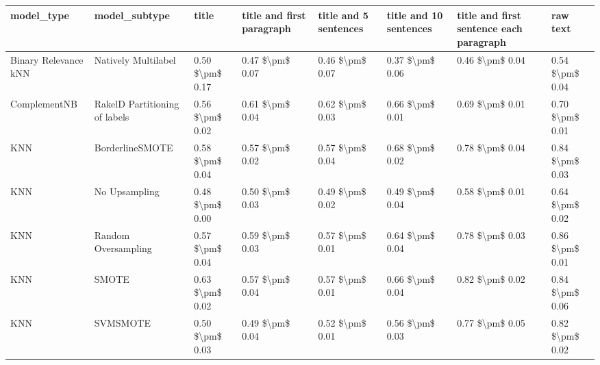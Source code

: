 \begin{tabular}{llllllll}
\toprule
                     model\_type &                 model\_subtype &               title & title and first paragraph & title and 5 sentences & title and 10 sentences & title and first sentence each paragraph &        raw text \\
\midrule
           Binary Relevance kNN &           Natively Multilabel &     0.50 \$\textbackslash pm\$ 0.17 &           0.47 \$\textbackslash pm\$ 0.07 &       0.46 \$\textbackslash pm\$ 0.07 &        0.37 \$\textbackslash pm\$ 0.06 &                         0.46 \$\textbackslash pm\$ 0.04 & 0.54 \$\textbackslash pm\$ 0.04 \\
                   ComplementNB & RakelD Partitioning of labels &     0.56 \$\textbackslash pm\$ 0.02 &           0.61 \$\textbackslash pm\$ 0.04 &       0.62 \$\textbackslash pm\$ 0.03 &        0.66 \$\textbackslash pm\$ 0.01 &                         0.69 \$\textbackslash pm\$ 0.01 & 0.70 \$\textbackslash pm\$ 0.01 \\
                            KNN &               BorderlineSMOTE &     0.58 \$\textbackslash pm\$ 0.04 &           0.57 \$\textbackslash pm\$ 0.02 &       0.57 \$\textbackslash pm\$ 0.04 &        0.68 \$\textbackslash pm\$ 0.02 &                         0.78 \$\textbackslash pm\$ 0.04 & 0.84 \$\textbackslash pm\$ 0.03 \\
                            KNN &                 No Upsampling &     0.48 \$\textbackslash pm\$ 0.00 &           0.50 \$\textbackslash pm\$ 0.03 &       0.49 \$\textbackslash pm\$ 0.02 &        0.49 \$\textbackslash pm\$ 0.04 &                         0.58 \$\textbackslash pm\$ 0.01 & 0.64 \$\textbackslash pm\$ 0.02 \\
                            KNN &           Random Oversampling &     0.57 \$\textbackslash pm\$ 0.04 &           0.59 \$\textbackslash pm\$ 0.03 &       0.57 \$\textbackslash pm\$ 0.01 &        0.64 \$\textbackslash pm\$ 0.04 &                         0.78 \$\textbackslash pm\$ 0.03 & 0.86 \$\textbackslash pm\$ 0.01 \\
                            KNN &                         SMOTE &     0.63 \$\textbackslash pm\$ 0.02 &           0.57 \$\textbackslash pm\$ 0.04 &       0.57 \$\textbackslash pm\$ 0.01 &        0.66 \$\textbackslash pm\$ 0.04 &                         0.82 \$\textbackslash pm\$ 0.02 & 0.84 \$\textbackslash pm\$ 0.06 \\
                            KNN &                      SVMSMOTE &     0.50 \$\textbackslash pm\$ 0.03 &           0.49 \$\textbackslash pm\$ 0.04 &       0.52 \$\textbackslash pm\$ 0.01 &        0.56 \$\textbackslash pm\$ 0.03 &                         0.77 \$\textbackslash pm\$ 0.05 & 0.82 \$\textbackslash pm\$ 0.02 \\

\end{tabular}
